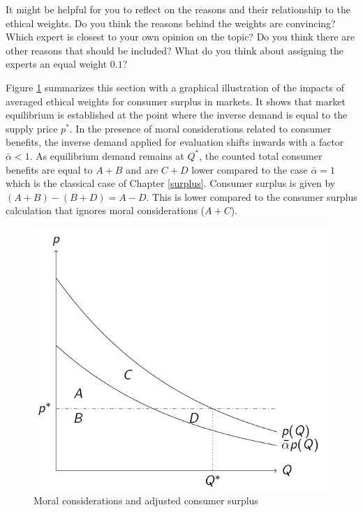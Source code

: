 \documentclass[
]{book}
\begin{document}
It might be helpful for you to reflect on the reasons and their relationship to the ethical weights. Do you think the reasons behind the weights are convincing? Which expert is closest to your own opinion on the topic? Do you think there are other reasons that should be included? What do you think about assigning the experts an equal weight \(0.1\)?

Figure \ref{fig:moralconsiderations} summarizes this section with a graphical illustration of the impacts of averaged ethical weights for consumer surplus in markets. It shows that market equilibrium is established at the point where the inverse demand is equal to the supply price \(p^*\). In the presence of moral considerations related to consumer benefits, the inverse demand applied for evaluation shifts inwards with a factor \(\bar{\alpha} < 1\). As equilibrium demand remains at \(Q^*\), the counted total consumer benefits are equal to \(A+B\) and are \(C+D\) lower compared to the case \(\bar{\alpha} = 1\) which is the classical case of Chapter \ref{surplus}. Consumer surplus is given by \((A+B)-(B+D)=A-D\). This is lower compared to the consumer surplus calculation that ignores moral considerations (\(A+C\)).

\begin{figure}
\includegraphics[width=8.17in]{./figures/moralconsiderations} \caption{Moral considerations and adjusted consumer surplus}\label{fig:moralconsiderations}
\end{figure}
\end{document}
